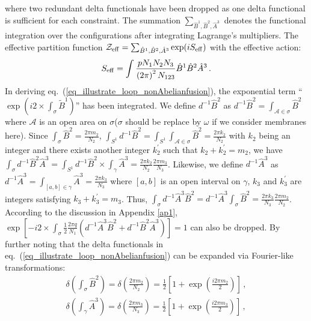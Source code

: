 \documentclass[11pt,nofootinbib,preprint]{revtex4-1}
\begin{document}
where two redundant delta functionals have been dropped as one delta functional  is sufficient for each constraint. The summation $\sum_{\hat{B}^1,\hat{B}^2,\hat{A}^3}$ denotes the functional integration over  the configurations after integrating Lagrange's multipliers. The effective partition function $\mathcal{Z}_{\rm eff}=\sum_{\hat{B}^1,\hat{B}^2,\hat{A}^3}\exp(iS_{\rm eff})$ with the effective action: 
\begin{align}
	S_{\rm eff}= \int{\frac{pN_1N_2N_3}{\left( 2\pi \right) ^2N_{123}}\hat{B}^1\hat{B}^2\hat{A}^3}\,.
\end{align}
In deriving eq.~(\ref{eq_illustrate_loop_nonAbelianfusion}), the exponential term ``$\exp\left(i2\times\int_{\sigma} \tilde{B}^1\right)$'' has been integrated. We define $d^{-1}\hat{B}^2$ as $d^{-1}\hat{B}^2=\int_{\mathcal{A} \in \sigma}{\hat{B}^2}$ where $\mathcal{A}$ is an open area on $\sigma$($\sigma$ should be replace by $\omega$ if we consider membranes here). Since $\int_{\sigma}{\hat{B}^2}=\frac{2\pi m_2}{N_2}$, $\int_{S^1}{d^{-1}\hat{B}^2}=\int_{S^1}{\int_{\mathcal{A} \in \sigma}{\hat{B}^2}}=\frac{2\pi k_2}{N_2}$ with $k_2$ being an integer and there exists another integer $k_{2}^{\prime}$ such that $k_2+k_{2}^{\prime}=m_2$, we have 
$	\int_{\sigma}{d^{-1}\hat{B}^2\hat{A}^3}=\int_{S^1}{d^{-1}\hat{B}^2}\times \int_{\gamma}{\hat{A}^3}=\frac{2\pi k_2}{N_2}\frac{2\pi m_3}{N_3}
$. Likewise, we define $d^{-1}\hat{A}^3$ as $d^{-1}\hat{A}^3=\int_{\left[a,b\right] \in \gamma}{\hat{A}^3}=\frac{2\pi k_3}{N_3}$ where $\left[a,b\right]$ is an open interval on $\gamma$, $k_3$ and $k_{3}^{\prime}$ are integers satisfying $k_3+k_{3}^{\prime}=m_3$. Thus, $\int_{\sigma}{d^{-1}\hat{A}^3\hat{B}^2}=d^{-1}\hat{A}^3\int_{\sigma}{\hat{B}^2}=\frac{2\pi k_3}{N_3}\frac{2\pi m_2}{N_2}$. According to the discussion in Appendix \ref{ap1},  $\exp \left[ -i2\times \int_{\sigma}{\frac{1}{2}\frac{2\pi q}{N_1}\left( d^{-1}\hat{A}^3\hat{B}^2+d^{-1}\hat{B}^2\hat{A}^3\! \right)} \right]=1$ can also be dropped.
By further noting that the delta functionals in eq.~(\ref{eq_illustrate_loop_nonAbelianfusion}) can be expanded via Fourier-like transformations:
\begin{gather}
	\delta \left( \int_{\sigma}{\hat{B}^2} \right) =\delta \left( \frac{2\pi m_2}{N_2} \right) =\frac{1}{2}\left[ 1+\exp \left( \frac{i2\pi m_2}{2} \right) \right] \,, \nonumber 
	\\
	\delta \left( \int_{\gamma}{\hat{A}^3} \right) =\delta \left( \frac{2\pi m_3}{N_3} \right) =\frac{1}{2}\left[ 1+\exp \left( \frac{i2\pi m_3}{2} \right) \right] \,,
\end{gather}
\end{document}

